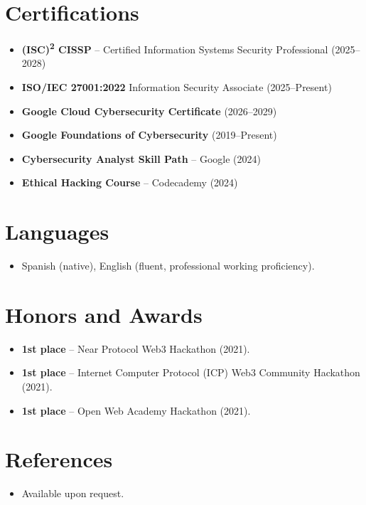 \documentclass[11pt,a4paper,sans]{moderncv}
\begin{document}
\section{Certifications}
\vspace{1pt}
\begin{itemize}
\item \textbf{(ISC)\textsuperscript{2} CISSP} -- Certified Information Systems Security Professional (2025--2028)
\item \textbf{ISO/IEC 27001:2022} Information Security Associate (2025--Present)
\item \textbf{Google Cloud Cybersecurity Certificate} (2026--2029)
\item \textbf{Google Foundations of Cybersecurity} (2019--Present)
\item \textbf{Cybersecurity Analyst Skill Path} -- Google (2024)
\item \textbf{Ethical Hacking Course} -- Codecademy (2024)
\end{itemize}


\section{Languages}
\vspace{1pt}
\begin{itemize}
\item Spanish (native), English (fluent, professional working proficiency).
\end{itemize}


\section{Honors and Awards}
\vspace{1pt}
\begin{itemize}
\item{\textbf{1st place} -- Near Protocol Web3 Hackathon (2021).}
\item{\textbf{1st place} -- Internet Computer Protocol (ICP) Web3 Community Hackathon (2021).}
\item{\textbf{1st place} -- Open Web Academy Hackathon (2021).}
\end{itemize}


\section{References}
\vspace{1pt}
\begin{itemize}
\item{Available upon request.}
\end{itemize}
\end{document}
